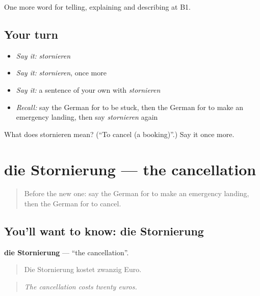 \begin{grammarlens}[title={What you've built}]
One more word for telling, explaining and describing at B1.
\end{grammarlens}

\subsection*{Your turn}
\begin{itemize}
\raggedright
  \item \emph{Say it:} \emph{stornieren}
  \item \emph{Say it:} \emph{stornieren}, once more
  \item \emph{Say it:} a sentence of your own with \emph{stornieren}
  \item \emph{Recall:} say the German for to be stuck, then the German for to make an emergency landing, then say \emph{stornieren} again
\end{itemize}

\begin{tcolorbox}[breakable,colback=teal!4,colframe=teal!35!black,title={Before you move on}]
What does stornieren mean? (\textquotedblleft{}To cancel (a booking)\textquotedblright{}.) Say it once more.
\end{tcolorbox}
\section[die Stornierung]{die Stornierung — the cancellation}

\label{lesson:GE-C420-stornierung}



\begin{quote}
Before the new one: say the German for to make an emergency landing, then the German for to cancel.
\end{quote}

\subsection*{You'll want to know: die Stornierung}
\textbf{die Stornierung} — \textquotedblleft{}the cancellation\textquotedblright{}.

\begin{quote}
Die Stornierung kostet zwanzig Euro.
\end{quote}

\begin{quote}
\emph{The cancellation costs twenty euros.}
\end{quote}

